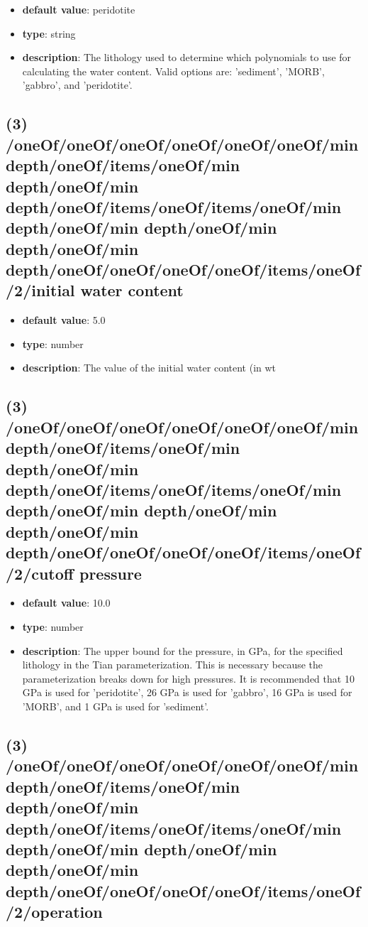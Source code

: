 \begin{itemize}[leftmargin=3em]\item {\bf default value}: peridotite
\item {\bf type}: string
\item {\bf description}: The lithology used to determine which polynomials to use for calculating the water content. Valid options are: 'sediment', 'MORB', 'gabbro', and 'peridotite'.
\end{itemize}\subsection{(3) /oneOf/oneOf/oneOf/oneOf/oneOf/oneOf/min depth/oneOf/items/oneOf/min depth/oneOf/min depth/oneOf/items/oneOf/items/oneOf/min depth/oneOf/min depth/oneOf/min depth/oneOf/min depth/oneOf/oneOf/oneOf/oneOf/items/oneOf/2/initial water content}
\begin{itemize}[leftmargin=3em]\item {\bf default value}: 5.0
\item {\bf type}: number
\item {\bf description}: The value of the initial water content (in wt%
\end{itemize}\subsection{(3) /oneOf/oneOf/oneOf/oneOf/oneOf/oneOf/min depth/oneOf/items/oneOf/min depth/oneOf/min depth/oneOf/items/oneOf/items/oneOf/min depth/oneOf/min depth/oneOf/min depth/oneOf/min depth/oneOf/oneOf/oneOf/oneOf/items/oneOf/2/cutoff pressure}
\begin{itemize}[leftmargin=3em]\item {\bf default value}: 10.0
\item {\bf type}: number
\item {\bf description}: The upper bound for the pressure, in GPa, for the specified lithology in the Tian parameterization. This is necessary because the parameterization breaks down for high pressures. It is recommended that 10 GPa is used for 'peridotite', 26 GPa is used for 'gabbro', 16 GPa is used for 'MORB', and 1 GPa is used for 'sediment'.
\end{itemize}\subsection{(3) /oneOf/oneOf/oneOf/oneOf/oneOf/oneOf/min depth/oneOf/items/oneOf/min depth/oneOf/min depth/oneOf/items/oneOf/items/oneOf/min depth/oneOf/min depth/oneOf/min depth/oneOf/min depth/oneOf/oneOf/oneOf/oneOf/items/oneOf/2/operation}
